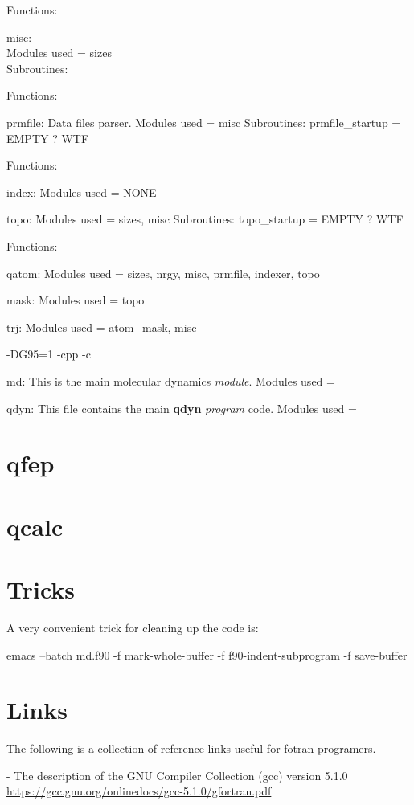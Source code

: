 \documentclass[10pt, oneside, pdftex]{article}
\begin{document}
Functions:


misc:\\
Modules used = sizes\\
Subroutines:

Functions:


prmfile: Data files parser.
Modules used = misc
Subroutines:
  prmfile\_startup = EMPTY ? WTF


Functions:


index:
Modules used = NONE


topo:
Modules used = sizes, misc
Subroutines:
  topo\_startup = EMPTY ? WTF


Functions:


qatom:
Modules used = sizes, nrgy, misc, prmfile, indexer, topo


mask:
Modules used = topo


trj:
Modules used = atom\_mask, misc




-DG95=1 -cpp -c

md: This is the main molecular dynamics \textit{module}.
Modules used =


qdyn: This file contains the main \textbf{qdyn} \textit{program} code.
Modules used =



\section{qfep}
\label{qfep}


\section{qcalc}
\label{qcalc}


\section{Tricks}
\label{tricks}

A very convenient trick for cleaning up the code is:

emacs --batch md.f90 -f mark-whole-buffer -f f90-indent-subprogram -f save-buffer


\section{Links}
\label{links}
The following  is a  collection of reference  links useful  for fotran
programers.


\noindent - The description of the GNU Compiler Collection (gcc) version 5.1.0\\
\url{https://gcc.gnu.org/onlinedocs/gcc-5.1.0/gfortran.pdf}
\end{document}
